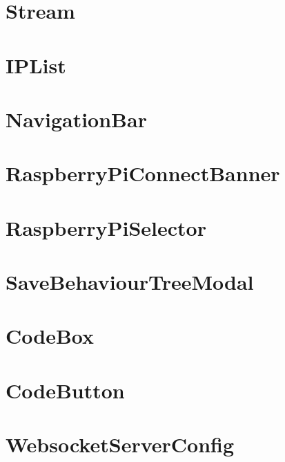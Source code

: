 \documentclass[twoside]{book}
\newcommand{\+}{\discretionary{\mbox{\scriptsize$\hookleftarrow$}}{}{}}
\begin{document}
\chapter{Stream}
\label{md_src_lib_home_Stream}

\chapter{IPList}
\label{md_src_lib_IPList}

\chapter{Navigation\+Bar}
\label{md_src_lib_NavigationBar}

\chapter{Raspberry\+Pi\+Connect\+Banner}
\label{md_src_lib_RaspberryPiConnectBanner}

\chapter{Raspberry\+Pi\+Selector}
\label{md_src_lib_RaspberryPiSelector}

\chapter{Save\+Behaviour\+Tree\+Modal}
\label{md_src_lib_SaveBehaviourTreeModal}

\chapter{Code\+Box}
\label{md_src_lib_validate_CodeBox}

\chapter{Code\+Button}
\label{md_src_lib_validate_CodeButton}

\chapter{Websocket\+Server\+Config}
\label{md_src_lib_WebsocketServerConfig}

\end{document}
